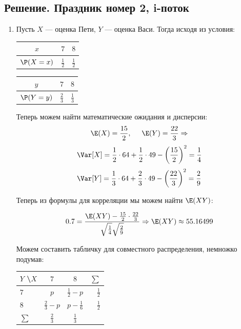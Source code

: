 \subsection{Решение. Праздник номер 2, i-поток}

\begin{enumerate}
\item
Пусть $X$ — оценка Пети, $Y$ — оценка Васи. Тогда исходя из условия:
\begin{center}

\begin{tabular}{ccc}
\toprule
$x$ & $7$ & $8$ \\ \midrule
$\P(X=x)$ & $\frac{1}{2}$ & $\frac{1}{2}$ \\ \bottomrule
\end{tabular}
\hspace{1cm}
\begin{tabular}{ccc}
\toprule
$y$ & $7$ & $8$ \\ \midrule
$\P(Y=y)$ & $\frac{2}{3}$ & $\frac{1}{3}$  \\ \bottomrule
\end{tabular}
\end{center}

Теперь можем найти математические ожидания и дисперсии:
\[
\E(X) = \frac{15}{2}, \hspace{0.5cm} \E(Y) = \frac{22}{3} \Rightarrow
\]
\[
\Var[X] = \frac{1}{2}\cdot 64 + \frac{1}{2}\cdot 49 - \left(\frac{15}{2}\right)^2 = \frac{1}{4}
\]
\[
\Var[Y] = \frac{1}{3}\cdot 64 + \frac{2}{3}\cdot 49 - \left(\frac{22}{3}\right)^2 = \frac{2}{9}
\]

Теперь из формулы для корреляции мы можем найти $\E(XY)$:

\[
0.7 = \frac{\E(XY)-\frac{15}{2}\cdot\frac{22}{3}}{\sqrt{\frac{1}{4}}\sqrt{\frac{2}{9}}} \Rightarrow \E(XY) \approx 55.16499
\]

Можем составить табличку для совместного распределения, немножко подумав:

\begin{center}
\begin{tabular}{@{}lccr@{}}
\toprule
$Y$ \textbackslash $X$ & $7$             & $8$             & $\sum$        \\ \midrule
$7$                              & $p$             & $\frac{1}{2}-p$ & $\frac{1}{2}$ \\
$8$                              & $\frac{2}{3}-p$ & $p-\frac{1}{6}$ & $\frac{1}{2}$ \\
$\sum$                           & $\frac{2}{3}$   & $\frac{1}{3}$   &               \\ \bottomrule
\end{tabular}
\end{center}


\end{enumerate}
